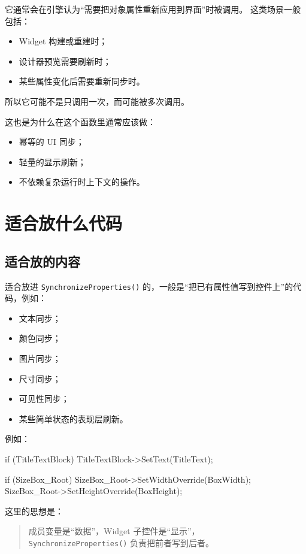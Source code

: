 \documentclass[10pt,CJKmath]{ctexart}
\begin{document}
它通常会在引擎认为“需要把对象属性重新应用到界面”时被调用。  
这类场景一般包括：

\begin{itemize}
	\item Widget 构建或重建时；
	\item 设计器预览需要刷新时；
	\item 某些属性变化后需要重新同步时。
\end{itemize}

所以它可能不是只调用一次，而可能被多次调用。

这也是为什么在这个函数里通常应该做：

\begin{itemize}
	\item 幂等的 UI 同步；
	\item 轻量的显示刷新；
	\item 不依赖复杂运行时上下文的操作。
\end{itemize}

\section{适合放什么代码}

\subsection{适合放的内容}

适合放进 \texttt{SynchronizeProperties()} 的，一般是“把已有属性值写到控件上”的代码，例如：

\begin{itemize}
	\item 文本同步；
	\item 颜色同步；
	\item 图片同步；
	\item 尺寸同步；
	\item 可见性同步；
	\item 某些简单状态的表现层刷新。
\end{itemize}

例如：

\begin{code}
	if (TitleTextBlock)
	{
		TitleTextBlock->SetText(TitleText);
	}
	
	if (SizeBox_Root)
	{
		SizeBox_Root->SetWidthOverride(BoxWidth);
		SizeBox_Root->SetHeightOverride(BoxHeight);
	}
\end{code}

这里的思想是：

\begin{quote}
	成员变量是“数据”，Widget 子控件是“显示”，\\
	\texttt{SynchronizeProperties()} 负责把前者写到后者。
\end{quote}
\end{document}
